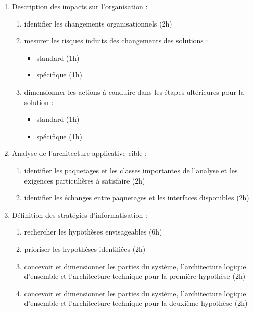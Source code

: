 \begin{enumerate}
          \begin{enumerate}
            \item Description des impacts sur l'organisation : 
                \begin{enumerate}
                  \item identifier les changements organisationnels (2h)
                  \item mesurer les risques induits des changements des solutions :
                    \begin{itemize}
                      \item standard (1h)
                      \item spécifique (1h)
                    \end{itemize}
                  \item dimensionner les actions à conduire dans les étapes ultérieures pour la solution :
                    \begin{itemize}
                      \item standard (1h)
                      \item spécifique (1h)
                    \end{itemize}
                \end{enumerate}
            \item Analyse de l'architecture applicative cible : 
                \begin{enumerate}
                  \item identifier les paquetages et les classes importantes de l'analyse et les exigences particulières à satisfaire (2h)
                  \item identifier les échanges entre paquetages et les interfaces disponibles (2h)
                \end{enumerate}
            \item Définition des stratégies d'informatisation : 
                \begin{enumerate}
                  \item rechercher les hypothèses envisageables (6h)
                  \item prioriser les hypothèses identifiées (2h)
                  \item concevoir et dimensionner les parties du système, l'architecture logique d'ensemble et l'architecture technique pour la première hypothèse (2h)
                  \item concevoir et dimensionner les parties du système, l'architecture logique d'ensemble et l'architecture technique pour la deuxième hypothèse (2h)

\end{enumerate}
\end{enumerate}
\end{enumerate}
